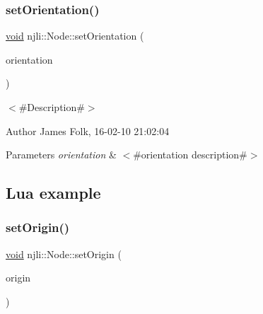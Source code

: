 \begin{DoxyCodeInclude}
\end{DoxyCodeInclude}
\mbox{\label{classnjli_1_1_node_a176cf31ddc96051576f3c2357b8c5db4}} 
\subsubsection{\texorpdfstring{set\+Orientation()}{setOrientation()}}
{\footnotesize\ttfamily \mbox{\hyperlink{_thread_8h_af1e856da2e658414cb2456cb6f7ebc66}{void}} njli\+::\+Node\+::set\+Orientation (\begin{DoxyParamCaption}\item[{const bt\+Quaternion \&}]{orientation }\end{DoxyParamCaption})}



$<$\#\+Description\#$>$ 

\begin{DoxyAuthor}{Author}
James Folk, 16-\/02-\/10 21\+:02\+:04
\end{DoxyAuthor}

\begin{DoxyParams}{Parameters}
{\em orientation} & $<$\#orientation description\#$>$\\
\hline
\end{DoxyParams}
\hypertarget{classnjli_1_1_steering_behavior_wander_ex1}{}\subsection{Lua example}\label{classnjli_1_1_steering_behavior_wander_ex1}

\begin{DoxyCodeInclude}
\end{DoxyCodeInclude}
\mbox{\label{classnjli_1_1_node_a16a10ec08e52af2b11258d84a243c0bd}} 
\subsubsection{\texorpdfstring{set\+Origin()}{setOrigin()}\hspace{0.1cm}{\footnotesize\ttfamily [1/2]}}
{\footnotesize\ttfamily \mbox{\hyperlink{_thread_8h_af1e856da2e658414cb2456cb6f7ebc66}{void}} njli\+::\+Node\+::set\+Origin (\begin{DoxyParamCaption}\item[{const bt\+Vector3 \&}]{origin }\end{DoxyParamCaption})}



